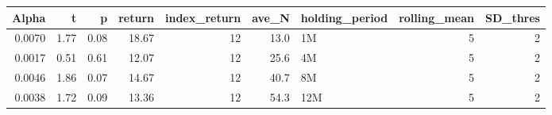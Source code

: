 \begin{table}[ht]
\centering
\begin{tabular}{rrrrrrlrr}
  \hline
Alpha & t & p & return & index\_return & ave\_N & holding\_period & rolling\_mean & SD\_thres \\ 
  \hline
0.0070 & 1.77 & 0.08 & 18.67 & 12 & 13.0 & 1M &  5 &  2 \\ 
  0.0017 & 0.51 & 0.61 & 12.07 & 12 & 25.6 & 4M &  5 &  2 \\ 
  0.0046 & 1.86 & 0.07 & 14.67 & 12 & 40.7 & 8M &  5 &  2 \\ 
  0.0038 & 1.72 & 0.09 & 13.36 & 12 & 54.3 & 12M &  5 &  2 \\ 
   \hline
\end{tabular}
\end{table}

